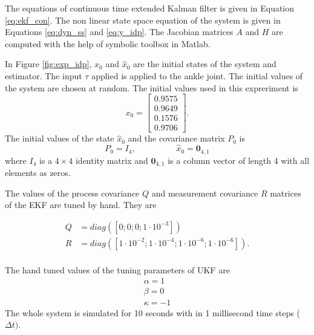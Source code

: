  The equations of continuous time extended Kalman filter is given in Equation \ref{eq:ekf_con}. The non linear state space equation of the system is given in Equations \ref{eq:dyn_ss} and \ref{eq:y_idp}. The Jacobian matrices $A$ and $H$ are computed with the help of symbolic toolbox in Matlab.

In Figure \ref{fig:exp_idp}, $x_0$ and $\hat x_0$ are the initial states of the system and estimator. The input $\tau$ applied is applied to the ankle joint. The initial values of the system are chosen at random. The initial values used in this expreriment is 
$$ x_0 = \begin{bmatrix} 0.9575 \\ 0.9649\\ 0.1576\\ 0.9706 \end{bmatrix}.$$  
The initial values of the state $\hat x_0$ and the covariance matrix $P_0$ is $$P_0 = I_4, \hspace{2cm} \hat x_0 = \textbf{0}_{4,1}$$ where $I_4$ is a $4 \times 4$ identity matrix and $\textbf{0}_{4,1}$ is a column vector of length 4 with all elements as zeros.


The values of the  process covariance $Q$ and measurement covariance $R$ matrices of the EKF are tuned by hand. They are 

$$  \begin{aligned}
    Q&=diag([0; 0; 0; 1\cdot{10}^{-3}]) \\
    R&=diag([1\cdot{10}^{-2}; 1\cdot{10}^{-4}; 1\cdot{10}^{-6}; 1\cdot{10}^{-6}]). \\
    \end{aligned}
    $$

The hand tuned values of the tuning parameters of UKF are 
$$  \begin{aligned}
    \alpha = 1 \\
    \beta = 0\\
    \kappa = -1 
    \end{aligned} $$ 
The whole system is simulated for 10 seconds with in 1 millisecond time steps ($\Delta t)$.
